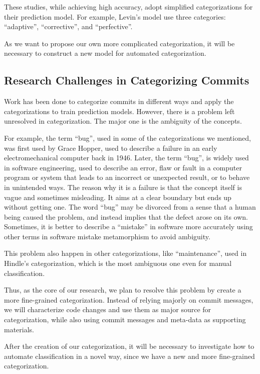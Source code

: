 These studies, while achieving high accuracy, adopt simplified categorizations for their prediction model. 
For example, Levin's model use three categories: ``adaptive'', ``corrective'', and ``perfective''.

As we want to propose our own more complicated categorization, it will be necessary to construct a new model for automated categorization.

\subsection{Research Challenges in Categorizing Commits}

Work has been done to categorize commits in different ways and apply the categorizations to train prediction models. 
However, there is a problem left unresolved in categorization.
The major one is the ambiguity of the concepts.

For example, the term ``bug'', used in some of the categorizations we mentioned, was first used by Grace Hopper, used to describe a failure in an early electromechanical computer back in 1946. 
Later, the term ``bug'', is widely used in software engineering, used to describe an error, flaw or fault in a computer program or system that leads to an incorrect or unexpected result, or to behave in unintended ways.
The reason why it is a failure is that the concept itself is vague and sometimes misleading. 
It aims at a clear boundary but ends up without getting one. 
The word ``bug'' may be divorced from a sense that a human being caused the problem, and instead implies that the defect arose on its own. 
Sometimes, it is better to describe a ``mistake'' in software more accurately using other terms in software mistake metamorphism to avoid ambiguity.

This problem also happen in other categorizations, like ``maintenance'', used in Hindle's categorization, which is the most ambiguous one even for manual classification.

Thus, as the core of our research, we plan to resolve this problem by create a more fine-grained categorization. 
Instead of relying majorly on commit messages, we will characterize code changes and use them as major source for categorization, while also using commit messages and meta-data as supporting materials.

After the creation of our categorization, it will be necessary to investigate how to automate classification in a novel way, since we have a new and more fine-grained categorization.